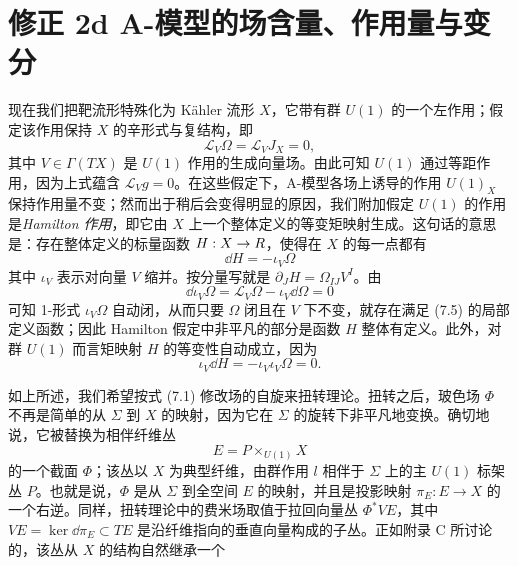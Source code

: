 \section{修正 2d A-模型的场含量、作用量与变分}

现在我们把靶流形特殊化为 Kähler 流形 $X$，它带有群 $U(1)$ 的一个左作用；假定该作用保持 $X$ 的辛形式与复结构，即
\[
\mathcal{L}_V\Omega=\mathcal{L}_VJ_X=0,
\]
其中 $V\in\Gamma(TX)$ 是 $U(1)$ 作用的生成向量场。由此可知 $U(1)$ 通过等距作用，因为上式蕴含 $\mathcal{L}_Vg=0$。在这些假定下，A-模型各场上诱导的作用 $U(1)_X$ 保持作用量不变；然而出于稍后会变得明显的原因，我们附加假定 $U(1)$ 的作用是\emph{Hamilton 作用}，即它由 $X$ 上一个整体定义的等变矩映射生成。这句话的意思是：存在整体定义的标量函数 $H:X\to R$，使得在 $X$ 的每一点都有
\begin{equation}
\dd H=-\iota_V\Omega \tag{7.5}
\end{equation}
其中 $\iota_V$ 表示对向量 $V$ 缩并。按分量写就是 $\partial_JH=\Omega_{IJ}V^I$。由
\[
\dd\iota_V\Omega=\mathcal{L}_V\Omega-\iota_V\dd\Omega=0
\]
可知 1-形式 $\iota_V\Omega$ 自动闭，从而只要 $\Omega$ 闭且在 $V$ 下不变，就存在满足 (7.5) 的局部定义函数；因此 Hamilton 假定中非平凡的部分是函数 $H$ 整体有定义。此外，对群 $U(1)$ 而言矩映射 $H$ 的等变性自动成立，因为
\[
\iota_V\dd H=-\iota_V\iota_V\Omega=0 .
\]



如上所述，我们希望按式 (7.1) 修改场的自旋来扭转理论。扭转之后，玻色场 $\Phi$ 不再是简单的从 $\Sigma$ 到 $X$ 的映射，因为它在 $\Sigma$ 的旋转下非平凡地变换。确切地说，它被替换为相伴纤维丛
\[
E=P\times_{U(1)}X
\]
的一个截面 $\Phi$；该丛以 $X$ 为典型纤维，由群作用 $l$ 相伴于 $\Sigma$ 上的主 $U(1)$ 标架丛 $P$。也就是说，$\Phi$ 是从 $\Sigma$ 到全空间 $E$ 的映射，并且是投影映射 $\pi_E:E\to X$ 的一个右逆。同样，扭转理论中的费米场取值于拉回向量丛 $\Phi^*VE$，其中 $VE=\ker\dd\pi_E\subset TE$ 是沿纤维指向的垂直向量构成的子丛。正如附录 C 所讨论的，该丛从 $X$ 的结构自然继承一个

